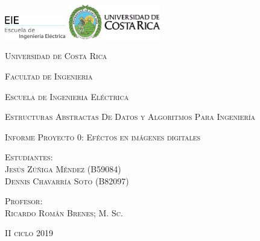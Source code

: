 \documentclass[11pt]{article}
\begin{document}
\sloppy%


\renewcommand{\refname}{}

\nocite{*} %

\begin{titlepage}
		\bf
		\centering
		\includegraphics[width=0.20\textwidth]{logoEIE.png}			
		\hspace{7cm} 
		\includegraphics[width=0.30\textwidth]{logoUCR.png}	
		\par
		\vspace{2cm}			
		{\scshape\large Universidad de Costa Rica \par}
		\vspace{0.6cm}
		{\scshape\large Facultad de Ingenieria\par}
		\vspace{0.6cm}
		{\scshape\large Escuela de Ingenieria Eléctrica\par}
		\vspace{0.6cm}
		{\scshape\large Estructuras Abstractas De Datos y Algoritmos Para Ingeniería   \par}
		\vspace{1.5cm}		
		{\scshape\large Informe Proyecto 0: Eféctos en imágenes digitales \par}
		\vspace{2.5cm}		
		{\scshape\large Estudiantes:\\ Jesús Zúñiga Méndez (B59084) \\ Dennis Chavarría Soto (B82097)  \par}
		\vspace{2.5cm}		
		{\scshape\large Profesor:\\ Ricardo Román Brenes; M. Sc. \par}
		\vspace{2.5cm}
		{\scshape\large II ciclo 2019 \par}
\end{titlepage}
\end{document}
